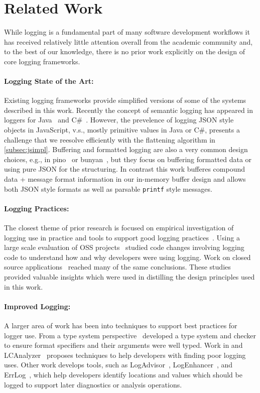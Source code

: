 \documentclass[sigplan,10pt]{acmart}
\begin{document}
\section{Related Work}
\label{sec:relwork}
While logging is a fundamental part of many software development workflows it has 
received relatively little attention overall from the academic community and, to the 
best of our knowledge, there is no prior work explicitly on the design of core 
logging frameworks. 

\paragraph{Logging State of the Art:}
\noindent
Existing logging frameworks provide simplified versions of some of the systems described 
in this work. Recently the concept of semantic logging has appeared in loggers for 
Java~\cite{log4j} and C\#~\cite{serilog}. However, the prevelence of logging JSON 
style objects in JavaScript, v.s., mostly primitive values in Java or C\#, presents 
a challenge that we reesolve efficiently with the flattening algorithm in \autoref{subsec:jsimpl}. 
Buffering and formatted logging are also a very common design choices, e.g., in pino~\cite{pino} 
or bunyan~\cite{bunyan}, but they focus on buffering formatted data or using pure 
JSON for the structuring. In contrast this work bufferes compound data + message format 
information in our in-memory buffer design and allows both JSON style formats as well as 
parsable \texttt{printf} style messages. 

\paragraph{Logging Practices:}
\noindent
The closest theme of prior research is focused on empirical investigation of logging 
use in practice and tools to support good logging practices~\cite{logstudy,logstudy2}. 
Using a large scale evaluation of OSS projects~\cite{logstudy} studied code changes 
involving logging code to understand how and why developers were using logging. 
Work on closed source applications~\cite{logstudy2} reached many of the same conclusions. 
These studies provided valuable insights which were used in distilling the design 
principles used in this work.

\paragraph{Improved Logging:}
\noindent
A larger area of work has been into techniques to support best practices for 
logger use. From a type system perspective~\cite{tyepcheckprintf} developed 
a type system and checker to ensure format specifiers and their arguments were 
well typed. Work in and LCAnalyzer~\cite{logginganti} proposes 
techniques to help developers with finding poor logging 
uses. Other work develops tools, such as  LogAdvisor~\cite{learnlog}, LogEnhancer~\cite{LogEnhancer}, 
and ErrLog~\cite{ErrLog}, which help developers identify locations and values which should 
be logged to support later diagnostics or analysis operations.
\end{document}
